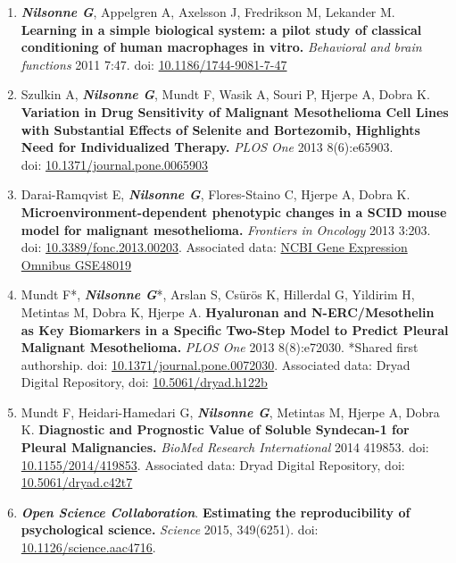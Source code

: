\documentclass[10pt]{article}
\begin{document}
\begin{enumerate}[nolistsep]
\item \textbf{\textit{Nilsonne G}}, Appelgren A, Axelsson J, Fredrikson M, Lekander M. \textbf{Learning in a simple biological system: a pilot study of classical conditioning of human macrophages in vitro.} \emph{Behavioral and brain functions} 2011 7:47.
doi: \href{http://dx.doi.org/10.1186/1744-9081-7-47}{10.1186/1744-9081-7-47}
\item Szulkin A, \textbf{\textit{Nilsonne G}}, Mundt F, Wasik A, Souri P, Hjerpe A, Dobra K. \textbf{Variation in Drug Sensitivity of Malignant Mesothelioma Cell Lines with Substantial Effects of Selenite and Bortezomib, Highlights Need for Individualized Therapy.} \emph{PLOS One} 2013 8(6):e65903.\\
doi: \href{http://dx.doi.org/10.1371/journal.pone.0065903}{10.1371/journal.pone.0065903}
\item Darai-Ramqvist E, \textbf{\textit{Nilsonne G}}, Flores-Staino C, Hjerpe A, Dobra K. \textbf{Microenvironment-dependent phenotypic changes in a SCID mouse model for malignant mesothelioma.} \emph{Frontiers in Oncology} 2013 3:203.
doi: \href{http://dx.doi.org/10.3389/fonc.2013.00203}{10.3389/fonc.2013.00203}.
Associated data: \href{http://www.ncbi.nlm.nih.gov/geo/query/acc.cgi?acc=GSE48019}{NCBI Gene Expression Omnibus GSE48019}
\item Mundt F*, \textbf{\textit{Nilsonne G}}*, Arslan S, Csürös K, Hillerdal G, Yildirim H, Metintas M, Dobra K, Hjerpe A. \textbf{Hyaluronan and N-ERC/Mesothelin as Key Biomarkers in a Specific Two-Step Model to Predict Pleural Malignant Mesothelioma.} \emph{PLOS One} 2013 8(8):e72030. *Shared first authorship.
doi: \href{http://dx.doi.org/10.1371/journal.pone.0072030}{10.1371/journal.pone.0072030}.
Associated data: Dryad Digital Repository, doi: \href{http://dx.doi.org/10.5061/dryad.h122b}{10.5061/dryad.h122b}
\item Mundt F, Heidari-Hamedari G, \textbf{\textit{Nilsonne G}}, Metintas M, Hjerpe A, Dobra K. \textbf{Diagnostic and Prognostic Value of Soluble Syndecan-1 for Pleural Malignancies.} \emph{BioMed Research International} 2014 419853.
doi: \href{http://dx.doi.org/10.1155/2014/419853}{10.1155/2014/419853}.
Associated data: Dryad Digital Repository, doi: \href{http://dx.doi.org/10.5061/dryad.c42t7}{10.5061/dryad.c42t7}
\item \textbf{\textit{Open Science Collaboration}}. \textbf{Estimating the reproducibility of psychological science.} \emph{Science} 2015, 349(6251).
doi: \href{http://dx.doi.org/10.1126/science.aac4716}{10.1126/science.aac4716}.

\end{enumerate}
\end{document}
